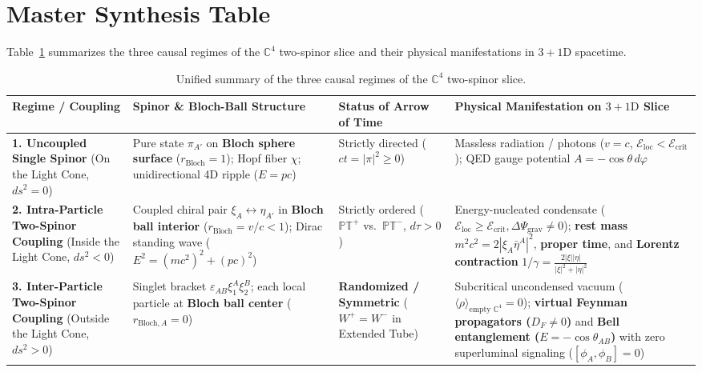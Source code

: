 \documentclass[11pt,a4paper]{article}
\begin{document}
\section{Master Synthesis Table}

Table~\ref{tab:synthesis} summarizes the three causal regimes of the $\mathbb{C}^4$ two-spinor slice and their physical manifestations in $3+1\text{D}$ spacetime.

\begin{table}[H]
\centering
\small
\renewcommand{\arraystretch}{1.35}
\begin{tabularx}{\textwidth}{>{\raggedright\arraybackslash}p{} >{\raggedright\arraybackslash}p{} >{\raggedright\arraybackslash}p{} >{\raggedright\arraybackslash}X}
\toprule
\textbf{Regime / Coupling} & \textbf{Spinor \& Bloch-Ball Structure} & \textbf{Status of Arrow of Time} & \textbf{Physical Manifestation on $3+1\text{D}$ Slice} \\
\midrule
\textbf{1. Uncoupled Single Spinor} (On the Light Cone, $ds^2 = 0$) & Pure state $\pi_{A'}$ on \textbf{Bloch sphere surface} ($r_{\text{Bloch}} = 1$); Hopf fiber $\chi$; unidirectional 4D ripple ($E = pc$) & Strictly directed ($ct = |\pi|^2 \ge 0$) & Massless radiation / photons ($v = c$, $\mathcal{E}_{\text{loc}} < \mathcal{E}_{\text{crit}}$); QED gauge potential $A = -\cos\theta\,d\varphi$ \\
\addlinespace
\textbf{2. Intra-Particle Two-Spinor Coupling} (Inside the Light Cone, $ds^2 < 0$) & Coupled chiral pair $\xi_A \leftrightarrow \eta_{A'}$ in \textbf{Bloch ball interior} ($r_{\text{Bloch}} = v/c < 1$); Dirac standing wave ($E^2 = (mc^2)^2 + (pc)^2$) & Strictly ordered ($\mathbb{PT}^+$ vs.\ $\mathbb{PT}^-$, $d\tau > 0$) & Energy-nucleated condensate ($\mathcal{E}_{\text{loc}} \ge \mathcal{E}_{\text{crit}}, \Delta\Psi_{\text{grav}} \neq 0$); \textbf{rest mass} $m^2c^2 = 2|\xi_A\bar{\eta}^A|^2$, \textbf{proper time}, and \textbf{Lorentz contraction} $1/\gamma = \frac{2|\xi||\eta|}{|\xi|^2 + |\eta|^2}$ \\
\addlinespace
\textbf{3. Inter-Particle Two-Spinor Coupling} (Outside the Light Cone, $ds^2 > 0$) & Singlet bracket $\varepsilon_{AB}\xi_1^A\xi_2^B$; each local particle at \textbf{Bloch ball center} ($r_{\text{Bloch},A} = 0$) & \textbf{Randomized / Symmetric} ($W^+ = W^-$ in Extended Tube) & Subcritical uncondensed vacuum ($\langle\rho\rangle_{\text{empty }\mathbb{C}^4} = 0$); \textbf{virtual Feynman propagators ($D_F \neq 0$)} and \textbf{Bell entanglement ($E = -\cos\theta_{AB}$)} with zero superluminal signaling ($[\phi_A,\phi_B] = 0$) \\
\bottomrule
\end{tabularx}
\caption{Unified summary of the three causal regimes of the $\mathbb{C}^4$ two-spinor slice.}
\label{tab:synthesis}
\end{table}
\end{document}
